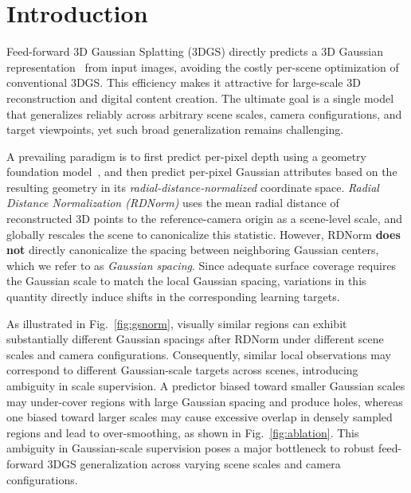 \section{Introduction}
\label{sec:introduction}


Feed-forward 3D Gaussian Splatting (3DGS) directly predicts a 3D
Gaussian representation~\citep{kerbl20233d} from input images, avoiding
the costly per-scene optimization of conventional 3DGS.
This efficiency makes it attractive for large-scale 3D reconstruction and
digital content creation.
The ultimate goal is a single model that generalizes reliably across
arbitrary scene scales, camera configurations, and target viewpoints, yet
such broad generalization remains challenging.

A prevailing paradigm is to first predict per-pixel depth using a
geometry foundation model~\citep{wang2025vggt,lin2025depth,team2026hy,jiang2026omnix,yu2026infinidepth},
and then predict per-pixel Gaussian attributes based on the resulting
geometry in its \emph{radial-distance-normalized} coordinate space.
\emph{Radial Distance Normalization (RDNorm)} uses the mean radial
distance of reconstructed 3D points to the reference-camera origin as a
scene-level scale, and globally rescales the scene to canonicalize this
statistic. However, RDNorm \textbf{does not} directly canonicalize the spacing between
neighboring Gaussian centers, which we refer to as \emph{Gaussian
spacing}. Since adequate surface coverage requires the Gaussian scale to match the
local Gaussian spacing, variations in this quantity directly induce shifts
in the corresponding learning targets.

As illustrated in Fig.~\ref{fig:gsnorm}, visually similar regions can exhibit
substantially different Gaussian spacings after RDNorm under different
scene scales and camera configurations. Consequently, similar local
observations may correspond to different Gaussian-scale targets across
scenes, introducing ambiguity in scale supervision.
A predictor biased toward smaller Gaussian scales may
under-cover regions with large Gaussian spacing and produce holes,
whereas one biased toward larger scales may cause excessive overlap in
densely sampled regions and lead to over-smoothing, as shown in
Fig.~\ref{fig:ablation}.
This ambiguity in Gaussian-scale supervision poses a major bottleneck to
robust feed-forward 3DGS generalization across varying scene scales and
camera configurations.


